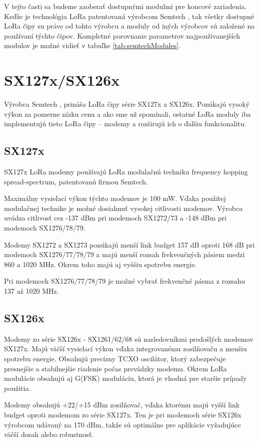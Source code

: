 \documentclass[slovak,master]{diploma}
\begin{document}
V tejto časti sa budeme zaoberať dostupnými modulmi pre koncové zariadenia.
Keďže je technológia LoRa patentovaná výrobcom Semtech \cite{semtech}, tak všetky dostupné LoRa čipy su práve od tohto výrobcu a moduly od iných výrobcov 
sú založené na používaní týchto čipov. Kompletné porovnanie parametrov najpouživanejších modulov je možné vidieť v tabuľke \ref{tab:semtechModules}.

\section{SX127x/SX126x}
Výrobca Semtech \cite{semtech}, prináša LoRa čipy série SX127x a SX126x. Ponúkajú vysoký výkon za pomerne nízku cenu a ako sme už spomínali, ostatné LoRa moduly 
iba implementujú tieto LoRa čipy -- modemy a rozširujú ich o ďalšiu funkcionalitu.

\subsection{SX127x}
SX127x LoRa modemy používajú LoRa modulačnú techniku frequency hopping spread-spectrum, patentovanú firmou Semtech.

Maximálny vysielací výkon týchto modemov je 100 mW.
Vďaka použitej modulačnej technike je možné dosiahnuť vysokej citlivosti modemov.
Výrobca uvádza citlivosť cez -137 dBm pri modemoch SX1272/73 a -148 dBm pri modemoch SX1276/78/79.

Modemy SX1272 a SX1273 ponúkajú menší link budget 157 dB oproti 168 dB pri modemoch SX1276/77/78/79 a majú menší rozsah frekvenčných pásiem medzi 860 a 1020 MHz.
Okrem toho majú aj vyššiu spotrebu energie.

Pri modemoch SX1276/77/78/79 je možné vybrať frekvenčné pásma z rozsahu 137 až 1020 MHz.

\subsection{SX126x}

Modemy zo série SX126x - SX1261/62/68 sú nasledovníkmi predošlých modemov SX127x. Majú väčší vysielací výkon vďaka integrovanému zosilňovaču a menšiu spotrebu energie. 
Obsahujú precízny TCXO oscilátor, ktorý zabezpečuje presnejšie a stabilnejšie riadenie počas prevádzky modemu. Okrem LoRa modulácie obsahujú aj G(FSK) moduláciu, ktorá je vhodná pre staršie 
prípady použitia.

Modemy obsahujú +22/+15 dBm zosilňovač, vďaka ktorému majú vyšší link budget oproti modemom zo série SX127x. 
Ten je pri modemoch série SX126x výrobcom udávaný na 170 dBm, takže sú optimálne pre aplikácie vyžadujúce väčší dosah alebo robustnosť.
\end{document}
